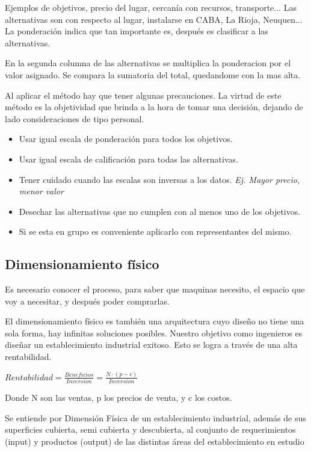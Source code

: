 \documentclass[titlepage,a4paper]{article}
\begin{document}
Ejemplos de objetivos, precio del lugar, cercanía con recursos, transporte...
Las alternativas son con respecto al lugar, instalarse en CABA, La Rioja, Neuquen...
La ponderación indica que tan importante es, después es clasificar a las alternativas.

En la segunda columna de las alternativas se multiplica la ponderacion por el valor asignado. Se compara la sumatoria del total, quedandome con la mas alta.


Al aplicar el método hay que tener algunas precauciones. La virtud de este método es la objetividad que brinda a la hora de tomar una decisión, dejando de lado
consideraciones de tipo personal. 
\begin{itemize}
    \item Usar igual escala de ponderación para todos los objetivos.
    \item Usar igual escala de calificación para todas las alternativas.
    \item Tener cuidado cuando las escalas son inversas a los datos. \textit{Ej. Mayor precio, menor valor}
    \item Desechar las alternativas que no cumplen con al menos uno de los objetivos.
    \item Si se esta en grupo es conveniente aplicarlo con representantes del mismo.
\end{itemize}

\subsection{Dimensionamiento físico}

Es necesario conocer el proceso, para saber que maquinas necesito, el espacio que voy a necesitar, y después poder comprarlas.

El dimensionamiento físico es también una arquitectura cuyo diseño no tiene una sola forma, hay infinitas soluciones posibles. Nuestro objetivo como ingenieros es diseñar un establecimiento industrial exitoso. Esto se logra a través de una alta rentabilidad.

\medskip

\begin{math}
Rentabilidad = \frac{Beneficios}{Inversion} = \frac{N \cdot (p - c)}{Inversion}
\end{math}
\medskip

Donde N son las ventas, p los precios de venta, y c los costos.

Se entiende por Dimensión Física de un establecimiento industrial, además de sus superficies cubierta, semi cubierta y descubierta, al conjunto de requerimientos (input) y productos (output) de las distintas áreas del establecimiento en estudio
\end{document}
